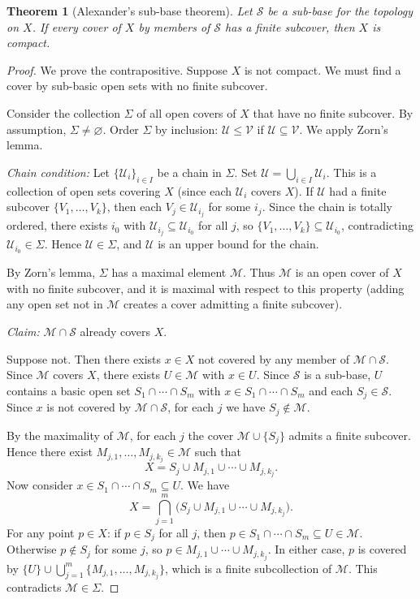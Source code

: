 \documentclass[11pt,a4paper,twoside]{book}
\newtheorem{theorem}{Theorem}[section]
\theoremstyle{remark}
\theoremstyle{definition}
\theoremstyle{definition}
\begin{document}
\begin{theorem}[Alexander's sub-base theorem]\label{thm:alexander}
Let $\mathcal{S}$ be a sub-base for the topology on $X$.  If every cover of
$X$ by members of $\mathcal{S}$ has a finite subcover, then $X$ is compact.
\end{theorem}

\begin{proof}
We prove the contrapositive.  Suppose $X$ is not compact.  We must find a cover
by sub-basic open sets with no finite subcover.

Consider the collection $\Sigma$ of all open covers of $X$ that have no finite
subcover.  By assumption, $\Sigma \neq \varnothing$.  Order $\Sigma$ by
inclusion: $\mathcal{U} \le \mathcal{V}$ if $\mathcal{U} \subseteq
\mathcal{V}$.  We apply Zorn's lemma.

\emph{Chain condition:}  Let $\{\mathcal{U}_i\}_{i \in I}$ be a chain in
$\Sigma$.  Set $\mathcal{U} = \bigcup_{i \in I} \mathcal{U}_i$.  This is a
collection of open sets covering $X$ (since each $\mathcal{U}_i$ covers $X$).
If $\mathcal{U}$ had a finite subcover $\{V_1, \ldots, V_k\}$, then each
$V_j \in \mathcal{U}_{i_j}$ for some $i_j$.  Since the chain is totally
ordered, there exists $i_0$ with $\mathcal{U}_{i_j} \subseteq
\mathcal{U}_{i_0}$ for all $j$, so $\{V_1, \ldots, V_k\} \subseteq
\mathcal{U}_{i_0}$, contradicting $\mathcal{U}_{i_0} \in \Sigma$.  Hence
$\mathcal{U} \in \Sigma$, and $\mathcal{U}$ is an upper bound for the chain.

By Zorn's lemma, $\Sigma$ has a maximal element $\mathcal{M}$.  Thus
$\mathcal{M}$ is an open cover of $X$ with no finite subcover, and it is
maximal with respect to this property (adding any open set not in $\mathcal{M}$
creates a cover admitting a finite subcover).

\emph{Claim:} $\mathcal{M} \cap \mathcal{S}$ already covers $X$.

Suppose not.  Then there exists $x \in X$ not covered by any member of
$\mathcal{M} \cap \mathcal{S}$.  Since $\mathcal{M}$ covers $X$, there exists
$U \in \mathcal{M}$ with $x \in U$.  Since $\mathcal{S}$ is a sub-base, $U$
contains a basic open set $S_1 \cap \cdots \cap S_m$ with $x \in S_1 \cap
\cdots \cap S_m$ and each $S_j \in \mathcal{S}$.  Since $x$ is not covered by
$\mathcal{M} \cap \mathcal{S}$, for each $j$ we have $S_j \notin \mathcal{M}$.

By the maximality of $\mathcal{M}$, for each $j$ the cover
$\mathcal{M} \cup \{S_j\}$ admits a finite subcover.  Hence there exist
$M_{j,1}, \ldots, M_{j, k_j} \in \mathcal{M}$ such that
\[
  X = S_j \cup M_{j,1} \cup \cdots \cup M_{j, k_j}.
\]
Now consider $x \in S_1 \cap \cdots \cap S_m \subseteq U$.  We have
\[
  X = \bigcap_{j=1}^m \bigl(S_j \cup M_{j,1} \cup \cdots \cup
  M_{j,k_j}\bigr).
\]
For any point $p \in X$:  if $p \in S_j$ for all $j$, then
$p \in S_1 \cap \cdots \cap S_m \subseteq U \in \mathcal{M}$.  Otherwise
$p \notin S_j$ for some $j$, so $p \in M_{j,1} \cup \cdots \cup M_{j,k_j}$.
In either case, $p$ is covered by $\{U\} \cup \bigcup_{j=1}^m
\{M_{j,1}, \ldots, M_{j,k_j}\}$, which is a finite subcollection of
$\mathcal{M}$.  This contradicts $\mathcal{M} \in \Sigma$.


\end{proof}
\end{document}
